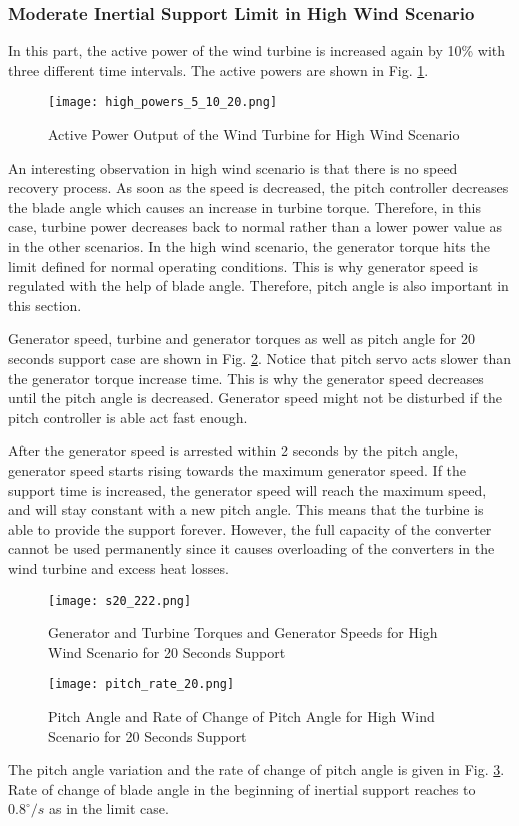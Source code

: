 \subsubsection{Moderate Inertial Support Limit in High Wind Scenario}
In this part, the active power of the wind turbine is increased again by 10\% with three different time intervals. The active powers are shown in Fig. \ref{high_powerss}.\par
\begin{figure}[h!]
	\centering
	\texttt{[image: high\_powers\_5\_10\_20.png]}
	\caption{Active Power Output of the Wind Turbine for High Wind Scenario}
	\label{high_powerss}
\end{figure}
An interesting observation in high wind scenario is that there is no speed recovery process. As soon as the speed is decreased, the pitch controller decreases the blade angle which causes an increase in turbine torque. Therefore, in this case, turbine power decreases back to normal rather than a lower power value as in the other scenarios. In the high wind scenario, the generator torque hits the limit defined for normal operating conditions. This is why generator speed is regulated with the help of blade angle. Therefore, pitch angle is also important in this section. \par
Generator speed, turbine and generator torques as well as pitch angle for 20 seconds support case are shown in Fig. \ref{high_s20}. Notice that pitch servo acts slower than the generator torque increase time. This is why the generator speed decreases until the pitch angle is decreased. Generator speed might not be disturbed if the pitch controller is able act fast enough.\par
After the generator speed is arrested within 2 seconds by the pitch angle, generator speed starts rising towards the maximum generator speed. If the support time is increased, the generator speed will reach the maximum speed, and will stay constant with a new pitch angle. This means that the turbine is able to provide the support forever. However, the full capacity of the converter cannot be used permanently since it causes  overloading of the converters in the wind turbine and excess heat losses. \par
\begin{figure}[h!]
	\centering
	\texttt{[image: s20\_222.png]}
	\caption{Generator and Turbine Torques and Generator Speeds for High Wind Scenario for 20 Seconds Support}
	\label{high_s20}
\end{figure}
\begin{figure}[h!]
	\centering
	\texttt{[image: pitch\_rate\_20.png]}
	\caption{Pitch Angle and Rate of Change of Pitch Angle for High Wind Scenario for 20 Seconds Support}
	\label{high_pitch}
\end{figure}
The pitch angle variation and the rate of change of pitch angle is given in Fig. \ref{high_pitch}. Rate of change of blade angle in the beginning of inertial support reaches to $0.8^{\circ}/s$ as in the limit case.

